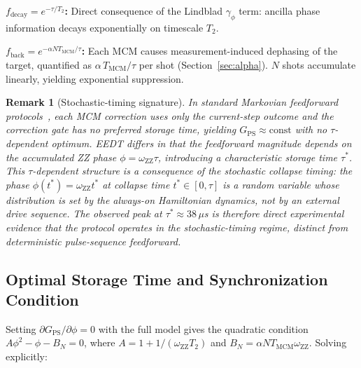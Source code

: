 \documentclass[10pt,twocolumn]{article}
\newtheorem{remark}{Remark}
\newcommand{\GPS}{G_{\mathrm{PS}}}
\newcommand{\oZZ}{\omega_{\mathrm{ZZ}}}
\newcommand{\Tmc}{T_{\mathrm{MCM}}}
\newcommand{\taustar}{\tau^*}
\begin{document}
\textbf{$f_\mathrm{decay} = e^{-\tau/T_2}$:}
Direct consequence of the Lindblad $\gamma_\phi$ term: ancilla phase
information decays exponentially on timescale $T_2$.

\textbf{$f_\mathrm{back} = e^{-\alpha N\Tmc/\tau}$:}
Each MCM causes measurement-induced dephasing of the target,
quantified as $\alpha\,\Tmc/\tau$ per shot (Section~\ref{sec:alpha}).
$N$ shots accumulate linearly, yielding exponential suppression.

\begin{remark}[Stochastic-timing signature]
\label{rem:nonmarkov}
In standard Markovian feedforward protocols~\cite{Santos2025,Koh2024,Krinner2022},
each MCM correction uses only the current-step outcome and the
correction gate has no preferred storage time, yielding
$\GPS \approx \mathrm{const}$ with no $\tau$-dependent optimum.
EEDT differs in that the feedforward magnitude depends on the
\emph{accumulated} ZZ phase $\phi = \oZZ\tau$, introducing a
characteristic storage time $\taustar$.
This $\tau$-dependent structure is a consequence of the stochastic
collapse timing: the phase $\phi(t^*) = \oZZ t^*$ at collapse time
$t^* \in [0,\tau]$ is a random variable whose distribution is set by
the always-on Hamiltonian dynamics, not by an external drive sequence.
The observed peak at $\taustar \approx 38\,\mu$s is therefore direct
experimental evidence that the protocol operates in the
\emph{stochastic-timing regime}, distinct from deterministic
pulse-sequence feedforward.
\end{remark}

\subsection{Optimal Storage Time and Synchronization Condition}

Setting $\partial \GPS/\partial\phi = 0$ with the full model gives the
quadratic condition $A\phi^2 - \phi - B_N = 0$, where
$A = 1 + 1/(\oZZ T_2)$ and $B_N = \alpha N\Tmc\oZZ$.
Solving explicitly:
\end{document}
